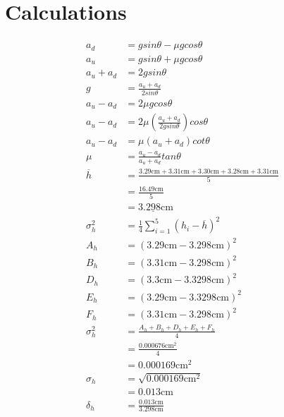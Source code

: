 \documentclass[12pt]{article}
\begin{document}
    \section{Calculations}
        \begin{align}
            a_d &= g sin \theta - \mu g cos \theta \nonumber\\
            a_u &= g sin \theta + \mu g cos \theta \nonumber \\
            a_u + a_d &= 2 g sin \theta \\
            g &= \frac{a_u + a_d}{2 sin \theta} \nonumber\\
            a_u - a_d &= 2 \mu g cos \theta \\
            a_u - a_d &= 2 \mu (\frac{a_u + a_d}{2 g sin \theta}) cos \theta \nonumber \\
            a_u - a_d &= \mu (a_u + a_d) cot \theta \nonumber\\
            \mu &= \frac{a_u - a_d}{a_u +a_d} tan \theta \nonumber\\
            \overline{h} &= \frac{3.29\text{cm}+3.31\text{cm}+3.30\text{cm}+3.28\text{cm}+3.31\text{cm}}{5}\\
            &= \frac{16.49\text{cm}}{5} \nonumber\\
            &= 3.2\underline{9}8 \text{cm}\nonumber\\
            \sigma_h^2 &= \frac{1}{4} \sum_{i=1}^5 (h_i - \overline{h})^2\\
            A_h &= (3.29\text{cm}-3.298\text{cm})^2 \nonumber \\
            B_h &= (3.31\text{cm}-3.298\text{cm})^2 \nonumber \\
            D_h &= (3.3\text{cm}-3.3298\text{cm})^2 \nonumber \\
            E_h &= (3.29\text{cm}-3.3298\text{cm})^2 \nonumber \\
            F_h &= (3.31\text{cm}-3.298\text{cm})^2 \nonumber \\
            \sigma_h^2 &= \frac{A_h + B_h + D_h + E_h + F_h }{4}\nonumber\\
            &= \frac{0.000676\text{cm}^2}{4}\nonumber\\
            &=0.000169\text{cm}^2\nonumber\\
            \sigma_h &= \sqrt{0.000169\text{cm}^2} \nonumber\\
            &=0.013\text{cm} \nonumber \\
            \delta_h &= \frac{0.013\text{cm}}{3.298\text{cm}} \\

\end{align}
\end{document}
